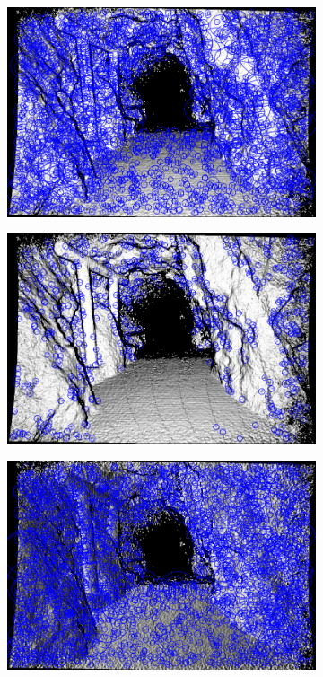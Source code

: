 \begin{figure}[H]
\begin{subfigure}[t]{0.25\linewidth}
    \includegraphics[width=\linewidth]{chapter06/results/SURF/flexion/default_kp0005.png}%
\end{subfigure}%
\begin{subfigure}[t]{0.25\linewidth}
    \includegraphics[width=\linewidth]{chapter06/results/SURF/flexion/oneoctave_kp0005.png}%
\end{subfigure}%
\begin{subfigure}[t]{0.25\linewidth}
    \includegraphics[width=\linewidth]{chapter06/results/SURF/bearing/default_kp0005.png}%

\end{subfigure}
\end{figure}
